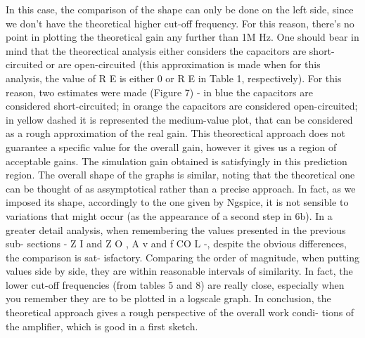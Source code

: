 In this case, the comparison of the shape can only be done on the left side, since we don’t
have the theoretical higher cut-off frequency. For this reason, there’s no point in plotting the
theoretical gain any further than 1M Hz.
One should bear in mind that the theorectical analysis either considers the capacitors are
short-circuited or are open-circuited (this approximation is made when for this analysis, the
value of R E is either 0 or R E in Table 1, respectively). For this reason, two estimates were
made (Figure 7) - in blue the capacitors are considered short-circuited; in orange the capacitors
are considered open-circuited; in yellow dashed it is represented the medium-value plot, that
can be considered as a rough approximation of the real gain. This theorectical approach does
not guarantee a specific value for the overall gain, however it gives us a region of acceptable
gains. The simulation gain obtained is satisfyingly in this prediction region.
The overall shape of the graphs is similar, noting that the theoretical one can be thought of
as assymptotical rather than a precise approach. In fact, as we imposed its shape, accordingly
to the one given by Ngspice, it is not sensible to variations that might occur (as the appearance
of a second step in 6b).
In a greater detail analysis, when remembering the values presented in the previous sub-
sections - Z I and Z O , A v and f CO L -, despite the obvious differences, the comparison is sat-
isfactory. Comparing the order of magnitude, when putting values side by side, they are within
reasonable intervals of similarity. In fact, the lower cut-off frequencies (from tables 5 and 8) are
really close, especially when you remember they are to be plotted in a logscale graph.
In conclusion, the theoretical approach gives a rough perspective of the overall work condi-
tions of the amplifier, which is good in a first sketch.


%

%

